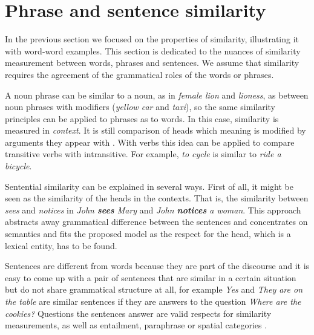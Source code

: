 \documentclass[11pt]{article}
\begin{document}
\section{Phrase and sentence similarity}

In the previous section we focused on the properties of similarity, illustrating it with word-word examples. This section is dedicated to the nuances of similarity measurement between words, phrases and sentences. We assume that similarity requires the agreement of the grammatical roles of the words or phrases.

A noun phrase can be similar to a noun, as in \textit{female lion} and \textit{lioness}, as between noun phrases with modifiers (\textit{yellow car} and \textit{taxi}), so the same similarity principles can be applied to phrases as to words. In this case, similarity is measured in \emph{context}. It is still comparison of heads which meaning is modified by arguments they appear with \cite{Dinu:2010:MDS:1870658.1870771,mitchell2010composition}. With verbs this idea can be applied to compare transitive verbs with intransitive. For example, \textit{to cycle} is similar to \textit{ride a bicycle}.

Sentential similarity can be explained in several ways. First of all, it might be seen as the similarity of the heads in the contexts. That is, the similarity between \textit{sees} and \textit{notices} in \textit{John \textbf{sees} Mary} and \textit{John \textbf{notices} a woman}. This approach abstracts away grammatical difference between the sentences and concentrates on semantics and fits the proposed model as the respect for the head, which is a lexical entity, has to be found.

Sentences are different from words because they are part of the discourse and it is easy to come up with a pair of sentences that are similar in a certain situation but do not share grammatical structure at all, for example \textit{Yes} and \textit{They are on the table} are similar sentences if they are answers to the question \textit{Where are the cookies?} Questions the sentences answer are valid respects for similarity measurements, as well as entailment, paraphrase \cite{White:2015:WSE:2838931.2838932} or spatial categories \cite{ritter-EtAl:2015:*SEM2015}.

%
%
\end{document}
